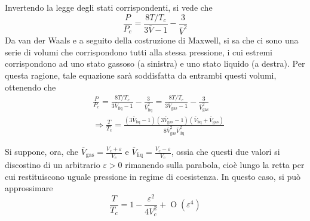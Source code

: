 \documentclass[11pt, a4paper]{scrartcl}
\theoremstyle{style}
\theoremstyle{style1}
\numberwithin{equation}{subsection}
\begin{document}
\begin{enumerate}[(1).]
\begin{center}
\begin{minipage}
\begin{tikzpicture}[>=Stealth, line cap=round, line join=round, scale=.8]
\end{tikzpicture}
			\end{minipage}
		\end{center}
Invertendo la legge degli stati corrispondenti, si vede che
\[
\frac{P}{P_c}=\frac{8 T / T_c}{3 \overline{V}-1}- \frac{3}{\overline{V}^2}
\] 
Da van der Waals e a seguito della costruzione di Maxwell, si sa che ci sono una serie di volumi che corrispondono tutti alla stessa pressione, i cui estremi corrispondono ad uno stato gassoso (a sinistra) e uno stato liquido (a destra).
Per questa ragione, tale equazione sar\`a soddisfatta da entrambi questi volumi, ottenendo che
\[
	\begin{split}
		&\frac{P}{P_c} = \frac{8 T / T_c}{3 \overline{V}_\text{liq}-1} - \frac{3}{\overline{V}_\text{liq}^2}= \frac{8 T / T_c}{3 \overline{V}_\text{gas}-1} - \frac{3}{\overline{V}_\text{gas}^2}\\
		&\Rightarrow \frac{T}{T_c} = \frac{\left(3\overline{V}_\text{liq}-1\right) \left(3\overline{V}_\text{gas}-1\right) \left(\overline{V}_\text{liq}+\overline{V}_\text{gas}\right) }{8 \overline{V}^2_\text{gas} \overline{V}^2_\text{liq}}
	\end{split}
\] 
		\begin{center}
			\begin{minipage}
				{.45\columnwidth}
Si suppone, ora, che $\overline{V}_\text{gas} = \frac{V_c+\varepsilon }{V_c}$ e $\overline{V}_\text{liq}=\frac{V_c-\varepsilon }{V_c}$, ossia che questi due valori si discostino di un arbitrario $\varepsilon >0$ rimanendo sulla parabola, cio\`e lungo la retta per cui restituiscono uguale pressione in regime di coesistenza.
In questo caso, si pu\`o approssimare 
\[
\frac{T}{T_c} = 1- \frac{\varepsilon ^2}{4V_c^2}+ \operatorname{O} (\varepsilon ^4)
\] 
			\end{minipage}
			\hfill
			\begin{minipage}
				{.45\columnwidth}
				\centering
{}
\end{minipage}
\end{center}
\end{enumerate}
\end{document}
